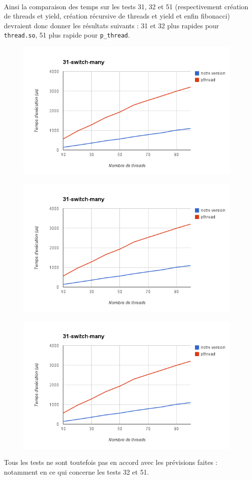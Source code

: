 \paragraph{}
Ainsi la comparaison des temps sur les tests 31, 32 et 51 (respectivement création de threads et yield, création récursive de threads et yield et enfin fibonacci) devraient donc donner les résultats suivants : 31 et 32 plus rapides pour \texttt{thread.so}, 51 plus rapide pour \texttt{p\_thread}.
\\
\begin{figure}[!h]
  \includegraphics[scale=0.5]{31.png}
\end{figure}

\begin{figure}[!h]
  \includegraphics[scale=0.5]{31.png}
\end{figure}

\begin{figure}[!h]
  \includegraphics[scale=0.5]{31.png}
\end{figure}

Tous les tests ne sont toutefois pas en accord avec les prévisions faites : notamment en ce qui concerne les tests 32 et 51.
